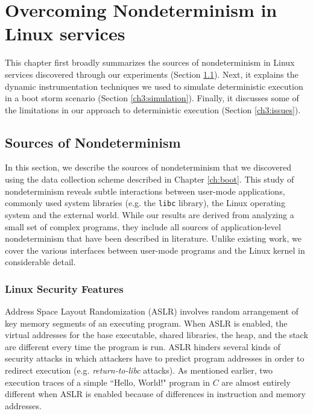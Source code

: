 \newenvironment{mylisting}
{\begin{list}{}{\setlength{\leftmargin}{1em}}\item\scriptsize\bfseries}
{\end{list}}

\chapter{Overcoming Nondeterminism in Linux services}
This chapter first broadly summarizes the sources of nondeterminism
in Linux services discovered through our experiments (Section \ref{ch3:sources}).
Next, it explains the dynamic instrumentation techniques
we used to simulate deterministic execution in a boot
storm scenario (Section \ref{ch3:simulation}).
Finally, it discusses some of the limitations 
in our approach to deterministic execution (Section \ref{ch3:issues}).

\section{Sources of Nondeterminism} \label{ch3:sources}
In this section, we describe the sources of nondeterminism
that we discovered using the data collection scheme
described in Chapter \ref{ch:boot}.
This study of nondeterminism reveals
subtle interactions between user-mode
applications, commonly used system libraries (e.g. the \texttt{libc} library),
the Linux operating system and the external world.
While our results are derived from analyzing a small
set of complex programs, they include
all sources of application-level nondeterminism that 
have been described in literature. Unlike existing work,
we cover the various interfaces between user-mode programs
and the Linux kernel in considerable detail.

\subsection{Linux Security Features} \label{ch3:security}
 \newline
Address Space Layout Randomization (ASLR) involves random arrangement of
key memory segments of an executing program. When ASLR is enabled,
the virtual addresses for the base executable, shared libraries, 
the heap, and the stack are different every time the program is run.
ASLR hinders several kinds of security attacks in which attackers have to predict
program addresses in order to redirect execution (e.g. \emph{return-to-libc} attacks). 
As mentioned earlier, two execution traces of a
simple ``Hello, World!" program in $C$ are almost entirely different
when ASLR is enabled because of differences in
instruction and memory addresses. \newline

